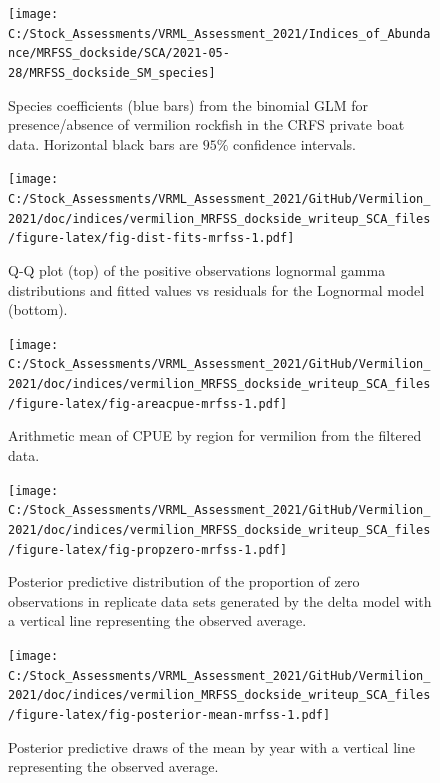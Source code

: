 \documentclass[
  english,
  a4paper,
]{article}
\begin{document}
\FloatBarrier

\FloatBarrier

\begin{figure}
\texttt{[image: C:/Stock\_Assessments/VRML\_Assessment\_2021/Indices\_of\_Abundance/MRFSS\_dockside/SCA/2021-05-28/MRFSS\_dockside\_SM\_species]} \caption{Species coefficients (blue bars) from the binomial GLM for presence/absence of vermilion rockfish in the CRFS private boat data. Horizontal black bars are $95\%$ confidence intervals.}\label{fig:fig-sm-mrfss}
\end{figure}

\begin{figure}
\centering
\texttt{[image: C:/Stock\_Assessments/VRML\_Assessment\_2021/GitHub/Vermilion\_2021/doc/indices/vermilion\_MRFSS\_dockside\_writeup\_SCA\_files/figure-latex/fig-dist-fits-mrfss-1.pdf]}
\caption{\label{fig:fig-dist-fits-mrfss}Q-Q plot (top) of the positive observations lognormal gamma distributions and fitted values vs residuals for the Lognormal model (bottom).}
\end{figure}

\FloatBarrier

\begin{figure}
\centering
\texttt{[image: C:/Stock\_Assessments/VRML\_Assessment\_2021/GitHub/Vermilion\_2021/doc/indices/vermilion\_MRFSS\_dockside\_writeup\_SCA\_files/figure-latex/fig-areacpue-mrfss-1.pdf]}
\caption{\label{fig:fig-areacpue-mrfss}Arithmetic mean of CPUE by region for vermilion from the filtered data.}
\end{figure}

\begin{figure}
\centering
\texttt{[image: C:/Stock\_Assessments/VRML\_Assessment\_2021/GitHub/Vermilion\_2021/doc/indices/vermilion\_MRFSS\_dockside\_writeup\_SCA\_files/figure-latex/fig-propzero-mrfss-1.pdf]}
\caption{\label{fig:fig-propzero-mrfss}Posterior predictive distribution of the proportion of zero observations in replicate data sets generated by the delta model with a vertical line representing the observed average.}
\end{figure}

\begin{figure}
\centering
\texttt{[image: C:/Stock\_Assessments/VRML\_Assessment\_2021/GitHub/Vermilion\_2021/doc/indices/vermilion\_MRFSS\_dockside\_writeup\_SCA\_files/figure-latex/fig-posterior-mean-mrfss-1.pdf]}
\caption{\label{fig:fig-posterior-mean-mrfss}Posterior predictive draws of the mean by year with a vertical line representing the observed average.}
\end{figure}
\end{document}
